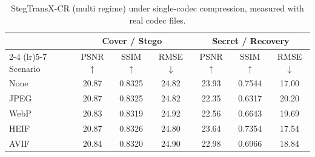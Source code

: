 \begin{table}[t]
\centering
\caption{StegTransX-CR (multi regime) under single-codec compression, measured with real codec files.}
\label{tab:multi-single-real}
\begin{tabular}{lcccccc}
\toprule
& \multicolumn{3}{c}{Cover / Stego} & \multicolumn{3}{c}{Secret / Recovery} \\
\cmidrule(lr){2-4} \cmidrule(lr){5-7}
Scenario & PSNR $\uparrow$ & SSIM $\uparrow$ & RMSE $\downarrow$ & PSNR $\uparrow$ & SSIM $\uparrow$ & RMSE $\downarrow$ \\
\midrule
None & 20.87 & 0.8325 & 24.82 & 23.93 & 0.7544 & 17.00 \\
JPEG & 20.87 & 0.8325 & 24.82 & 22.35 & 0.6317 & 20.20 \\
WebP & 20.83 & 0.8319 & 24.92 & 22.56 & 0.6643 & 19.69 \\
HEIF & 20.87 & 0.8326 & 24.80 & 23.64 & 0.7354 & 17.54 \\
AVIF & 20.84 & 0.8320 & 24.90 & 22.98 & 0.6966 & 18.84 \\
\bottomrule
\end{tabular}
\end{table}
